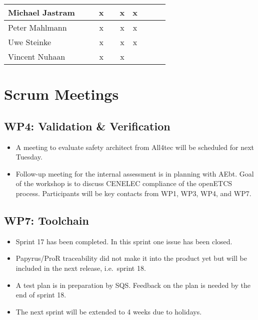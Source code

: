 \documentclass[a4paper, 11pt]{article}
\begin{document}
\begin{tabular}{|l|c|c|c||c|c|c||c|c|c|}
Michael Jastram      &   &   & x  &  & x & x \\\hline
Peter Mahlmann       &   &   & x &   & x & x \\\hline
Uwe Steinke          &  &  & x &  & x & x \\\hline
Vincent Nuhaan       &   &   & x &  & x  &   \\\hline
\end{tabular}


\section{Scrum Meetings}



\subsection{WP4: Validation \& Verification}
\begin{itemize}
\item A meeting to evaluate safety architect from All4tec will be scheduled for next Tuesday.
\item Follow-up meeting for the internal assessment is in planning with AEbt. Goal of the workshop is to discuss CENELEC compliance of the openETCS process. Participants will be key contacts from WP1, WP3, WP4, and WP7.
\end{itemize}


\subsection{WP7: Toolchain}

\begin{itemize}
\item Sprint 17 has been completed. In this sprint one issue has been closed.
\item Papyrus/ProR traceability did not make it into the product yet but will be included in the next release, i.e.~sprint 18.
\item A test plan is in preparation by SQS. Feedback on the plan is needed by the end of sprint 18.
\item The next sprint will be extended to 4 weeks due to holidays.
\end{itemize}
\end{document}
